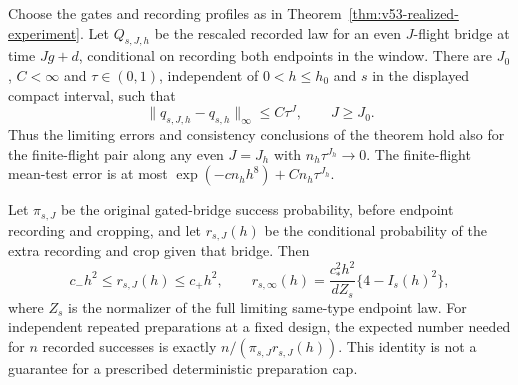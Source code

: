 \begin{corollary}
\label{cor:v53-finite-flight}
Choose the gates and recording profiles as in
Theorem~\ref{thm:v53-realized-experiment}.  Let $Q_{s,J,h}$ be the rescaled
recorded law for an even $J$-flight bridge at time $Jg+d$, conditional on
recording both endpoints in the window.  There are $J_0$, $C<\infty$ and
$\tau\in(0,1)$, independent of $0<h\le h_0$ and $s$ in the displayed
compact interval, such that
\begin{equation}\label{eq:v53-finite-flight}
       \|q_{s,J,h}-q_{s,h}\|_\infty\le C\tau^J,
                  \qquad J\ge J_0.
\end{equation}
Thus the limiting errors and consistency conclusions of the theorem hold
also for the finite-flight pair along any even $J=J_h$ with
$n_h\tau^{J_h}\to0$.  The finite-flight mean-test error is at most
$\exp(-cn_hh^8)+Cn_h\tau^{J_h}$.

Let $\pi_{s,J}$ be the original gated-bridge success probability, before
endpoint recording and cropping, and let $r_{s,J}(h)$ be the conditional
probability of the extra recording and crop given that bridge.  Then
\begin{equation}\label{eq:v53-recording-mass}
 c_-h^2\le r_{s,J}(h)\le c_+h^2,\qquad
 r_{s,\infty}(h)=\frac{c_*^2h^2}{dZ_s}\{4-I_s(h)^2\},
\end{equation}
where $Z_s$ is the normalizer of the full limiting same-type endpoint law.
For independent repeated preparations at a fixed design, the expected
number needed for $n$ recorded successes is exactly
$n/(\pi_{s,J}r_{s,J}(h))$.  This identity is not a guarantee for a
prescribed deterministic preparation cap.
\end{corollary}

